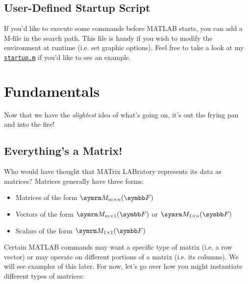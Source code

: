 \documentclass{article}
\begin{document}
\subsection{User-Defined Startup Script}

If you'd like to execute some commands before MATLAB starts, you can add
a  M-file in the search path.  This file is handy if you wish to
modify the environment at runtime (i.e. set graphic options).  Feel free
to take a look at my \href{https://github.com/jacobkoziej/dotfiles/%
blob/master/.config/matlab/startup.m}{\texttt{startup.m}} if you'd like
to see an example.

\section{Fundamentals}

Now that we have the \emph{slightest} idea of what's going on, it's out
the frying pan and into the fire!

\subsection{Everything's a Matrix!}

Who would have thought that MATrix LABratory represents its data as
matrices?  Matrices generally have three forms:

\begin{itemize}
	\item
		Matrices of the form \(\matrixField{m}{n}{F}\)

	\item
		Vectors of the form \(\matrixField{m}{1}{F}\) or
		\(\matrixField{1}{n}{F}\)

	\item
		Scalars of the form \(\matrixField{1}{1}{F}\)
\end{itemize}

Certain MATLAB commands may want a specific type of matrix (i.e. a row
vector) or may operate on different portions of a matrix (i.e. its
columns).  We will see examples of this later.  For now, let's go over
how you might instantiate different types of matrices:

\inputminted{matlab}{01-matlab-at-a-glance.d/instantiate-matrix.m}
\end{document}
